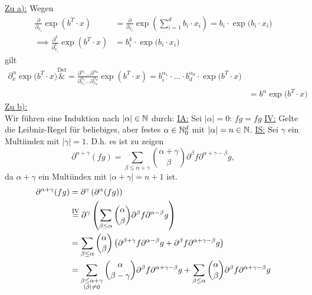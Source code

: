 \documentclass[12pt,a4paper]{article}
\begin{document}
\begin{lösung}
\underline{Zu a):}
Wegen
\begin{align*}
\frac{\partial}{\partial_{x_i}}\exp(b^T\cdot x)
&=\frac{\partial}{\partial_{x_i}}\exp\left(\sum\limits_{i=1}^d b_i\cdot x_i\right)
=b_i\cdot\exp\big(b_i\cdot x_i\big)\\
\implies\frac{\partial^k}{\partial_{x_i}^k}\exp(b^T\cdot x)
&=b_i^k\cdot\exp\big(b_i\cdot x_i\big)
\end{align*}
gilt
\begin{align*}
\partial_x^\alpha\exp\big(b^T\cdot x\big)
\overset{\text{Def}}&{=}
\frac{\partial^{\alpha_1}\ldots\partial^{\alpha_d}}{\partial_{x_1}^{\alpha_1}\ldots\partial_{x_d}^{\alpha_d}}\exp(b^T\cdot x)
=b_i^{\alpha_1}\cdot\ldots\cdot b_d^{\alpha_d}\cdot\exp\big(b^T\cdot x\big)\\
&=b^\alpha \exp\big(b^T\cdot x\big)
\end{align*}
\underline{Zu b):}\\
Wir führen eine Induktion nach $|\alpha|\in\mathbb{N}$ durch:\nl
\ul{IA:} Sei $|\alpha|=0$: $fg=fg$ %
\nl
\ul{IV:} Gelte die Leibniz-Regel für beliebiges, aber festes $\alpha\in\mathbb{N}_0^d$ mit $|\alpha|=n\in\mathbb{N}$.\nl
\ul{IS:} Sei $\gamma$ ein Multiindex mit $|\gamma|=1$. D.h. es ist zu zeigen
\begin{equation*}
	\partial^{\alpha + \gamma}(fg) = \displaystyle \sum_{\beta \leq \alpha + \gamma} \binom{\alpha + \gamma}{\beta}\partial^\beta f \partial^{\alpha+\gamma -\beta}g,
\end{equation*}
da $\alpha + \gamma$ ein Multiindex mit $|\alpha + \gamma|=n+1$ ist.
\begin{align*}
	\partial^{\alpha + \gamma}(fg) &= \partial^{\gamma}\left( \partial^\alpha(fg) \right)\\
	&\stackeq{\text{IV}} \partial^{\gamma}\left( \displaystyle \sum_{\beta \leq \alpha} \binom{\alpha }{\beta}\partial^\beta f \partial^{\alpha -\beta}g \right)\\
	&= \displaystyle \sum_{\beta \leq \alpha} \binom{\alpha }{\beta} \left( \partial^{\beta+\gamma} f \partial^{\alpha -\beta}g + \partial^{\beta} f \partial^{\alpha +\gamma -\beta}g \right)\\
	&= \displaystyle \sum_{\substack{\beta \leq \alpha + \gamma \\ |\beta|\neq 0}} \binom{\alpha }{\beta - \gamma} \partial^{\beta} f \partial^{\alpha +\gamma -\beta}g + \displaystyle \sum_{\beta \leq \alpha} \binom{\alpha }{\beta}  \partial^{\beta} f \partial^{\alpha +\gamma -\beta}g\\

\end{align*}
\end{lösung}
\end{document}
